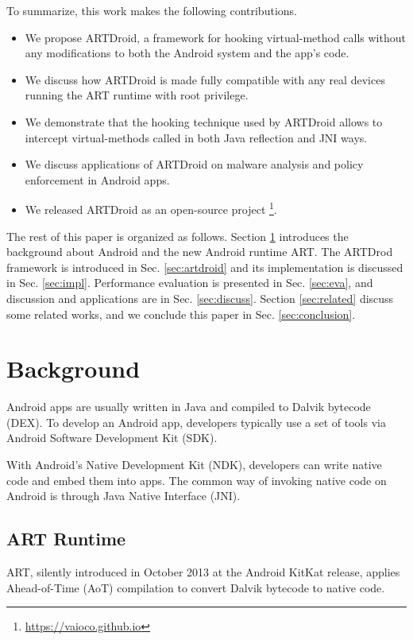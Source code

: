 To summarize, this work makes the following contributions.

\begin{itemize}
\item We propose ARTDroid, a framework for hooking virtual-method calls without any modifications to both the Android system and the app's code.
\item We discuss how ARTDroid is made fully compatible with any real devices running the ART runtime with root privilege.
\item We demonstrate that the hooking technique used by ARTDroid allows to intercept virtual-methods called in both Java reflection and JNI ways.
\item We discuss applications of ARTDroid on malware analysis and policy enforcement in Android apps.
\item We released ARTDroid as an open-source project \footnote{\url{https://vaioco.github.io}}. 
\end{itemize}

The rest of this paper is organized as follows. Section \ref{sec:backg} introduces the background about Android and the new Android runtime ART. The ARTDrod framework is introduced in Sec. \ref{sec:artdroid} and its implementation is discussed in Sec. \ref{sec:impl}. Performance evaluation is presented in Sec. \ref{sec:eva}, and discussion and applications are in Sec. \ref{sec:discuss}. Section \ref{sec:related} discuss some related works, and we conclude this paper in Sec. \ref{sec:conclusion}.

\section{Background}
\label{sec:backg}

Android apps are usually written in Java and compiled to Dalvik bytecode (DEX). To develop an Android app, developers typically use a set of tools via Android Software Development Kit (SDK). 

With Android's Native Development Kit (NDK), developers can write native code and embed them into apps. The common way of invoking native code on Android is through Java Native Interface (JNI).


\subsection{ART Runtime}
\label{subsec:art}

ART, silently introduced in October 2013 at the Android KitKat release, applies Ahead-of-Time (AoT) compilation to convert Dalvik bytecode to native code. 

